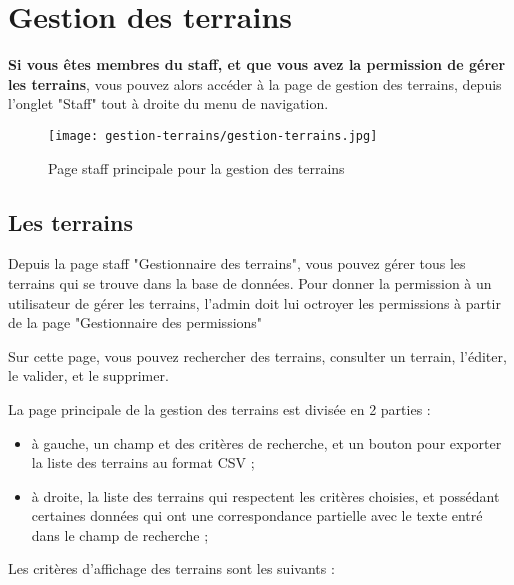 \section{Gestion des terrains}

\textbf{Si vous êtes membres du staff, et que vous avez la permission de gérer les terrains}, vous pouvez alors accéder à la page de gestion des terrains, depuis l'onglet "Staff" tout à droite du menu de navigation.

\begin{figure}[H]
\centering
\texttt{[image: gestion-terrains/gestion-terrains.jpg]}
\caption{Page staff principale pour la gestion des terrains}
\end{figure}

\subsection{Les terrains}

Depuis la page staff "Gestionnaire des terrains", vous pouvez gérer tous les terrains qui se trouve dans la base de données. Pour donner la permission à un utilisateur de gérer les terrains, l'admin doit lui octroyer les permissions à partir de la page "Gestionnaire des permissions"

\bigskip

Sur cette page, vous pouvez rechercher des terrains, consulter un terrain, l'éditer, le valider, et le supprimer.\newline

La page principale de la gestion des terrains est divisée en 2 parties :

\begin{itemize}
\item  à gauche, un champ et des critères de recherche, et un bouton pour exporter la liste des terrains au format CSV ;
\item à droite, la liste des terrains qui respectent les critères choisies, et possédant certaines données qui ont une correspondance partielle avec le texte entré dans le champ de recherche ;
\end{itemize}
\bigskip

Les critères d'affichage des terrains sont les suivants :

